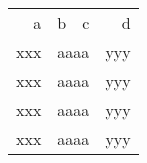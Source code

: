 \documentclass{article}
\begin{document}
\begin{tabular}{rrrr}
\rowcolor{yellow}
a&b&c&d\\
xxx&\multicolumn{2}{r}{aaaa}&yyy\\
\rowcolor{yellow}
xxx&\multicolumn{2}{r}{aaaa}&yyy\\
\rowcolor{yellow}
xxx&\multicolumn{2}{r}{aaaa}&yyy\\
xxx&\multicolumn{2}{r}{aaaa}&yyy
\end{tabular}
\end{document}
